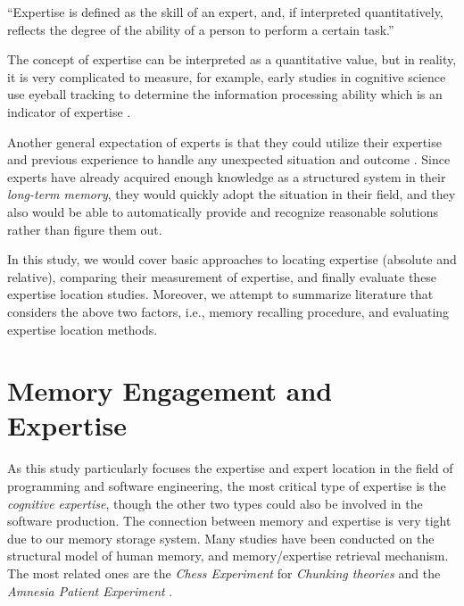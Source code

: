 \begin{displayquote}
``Expertise is defined as the skill of an expert, and, if interpreted quantitatively, reflects the degree of the ability of a person to perform a certain task.''
\end{displayquote}

The concept of expertise can be interpreted as a quantitative value, but in reality, it is very complicated to measure, for example, early studies in cognitive science use eyeball tracking to determine the information processing ability which is an indicator of expertise \cite{gobet1996recall}.

Another general expectation of experts is that they could utilize their expertise and previous experience to handle any unexpected situation and outcome \cite{ericsson2006cambridge}. Since experts have already acquired enough knowledge as a structured system in their \textit{long-term memory}, they would quickly adopt the situation in their field, and they also would be able to automatically provide and recognize reasonable solutions rather than figure them out.

In this study, we would cover basic approaches to locating expertise (absolute and relative), comparing their measurement of expertise, and finally evaluate these expertise location studies. Moreover, we attempt to summarize literature that considers the above two factors, i.e., memory recalling procedure, and evaluating expertise location methods.

\section{Memory Engagement and Expertise}

As this study particularly focuses the expertise and expert location in the field of programming and software engineering, the most critical type of expertise is the \textit{cognitive expertise}, though the other two types could also be involved in the software production. The connection between memory and expertise is very tight due to our memory storage system. Many studies have been conducted on the structural model of human memory, and memory/expertise retrieval mechanism. The most related ones are the \textit{Chess Experiment} for \textit{Chunking theories} \cite{chase1973perception, de2008thought, gobet1996recall} and the \textit{Amnesia Patient Experiment} \cite{cohen1980preserved}.

